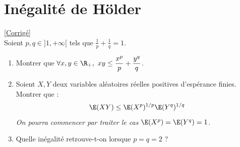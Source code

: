 \documentclass[8pt]{book}
\begin{document}
\section{Inégalité de Hölder }
\label{Inégalité de Hölder}
\textcolor{blue}{\hyperref[Inégalité de Hölder corrigé]{[Corrigé]}}\\
Soient $p,q\in ]1,+\infty[$ tels que $\displaystyle\frac{1}{p}+\frac{1}{q}=1$.
\begin{enumerate}
	\item Montrer que $\forall x,y\in \R_+,\ xy\leq \displaystyle\frac{x^p}{p}+\frac{y^q}{q}$.
	\item Soient $X,Y$ deux variables aléatoires réelles positives d'espérance finies. Montrer que :
	$$\E(XY)\leq \E(X^p)^{1/p}\E(Y^q)^{1/q}$$
	\textit{On pourra commencer par traiter le cas $\E(X^p)=\E(Y^q)=1$.}
	\item Quelle inégalité retrouve-t-on lorsque $p=q=2$ ?
\end{enumerate}
\end{document}
